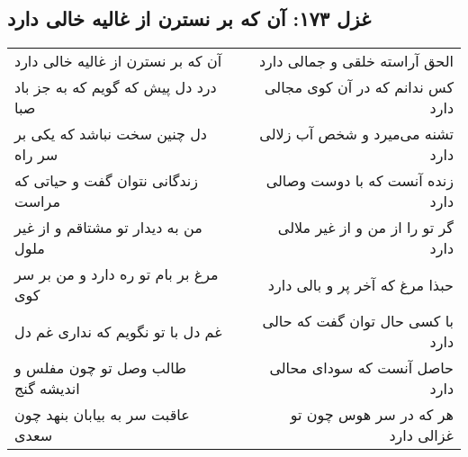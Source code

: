 \begin{center}
\section*{غزل ۱۷۳: آن که بر نسترن از غالیه خالی دارد}
\label{sec:173}
\begin{longtable}{l p{0.5cm} r}
آن که بر نسترن از غالیه خالی دارد
&&
الحق آراسته خلقی و جمالی دارد
\\
درد دل پیش که گویم که به جز باد صبا
&&
کس ندانم که در آن کوی مجالی دارد
\\
دل چنین سخت نباشد که یکی بر سر راه
&&
تشنه می‌میرد و شخص آب زلالی دارد
\\
زندگانی نتوان گفت و حیاتی که مراست
&&
زنده آنست که با دوست وصالی دارد
\\
من به دیدار تو مشتاقم و از غیر ملول
&&
گر تو را از من و از غیر ملالی دارد
\\
مرغ بر بام تو ره دارد و من بر سر کوی
&&
حبذا مرغ که آخر پر و بالی دارد
\\
غم دل با تو نگویم که نداری غم دل
&&
با کسی حال توان گفت که حالی دارد
\\
طالب وصل تو چون مفلس و اندیشه گنج
&&
حاصل آنست که سودای محالی دارد
\\
عاقبت سر به بیابان بنهد چون سعدی
&&
هر که در سر هوس چون تو غزالی دارد
\\
\end{longtable}
\end{center}
